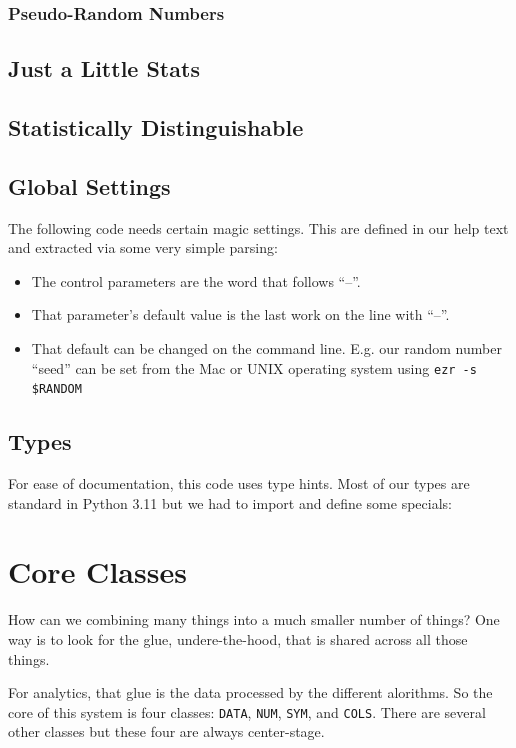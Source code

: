 \documentclass[landscape,	DIV=calc,%
							paper=letter,%
							fontsize=10pt,%
							twocolumn]{scrartcl}	 					%
\newcommand{\VERSION}{3.11}
\begin{document}
\subsubsection{Pseudo-Random Numbers}

\subsection{Just a Little Stats}
\subsection{Statistically Distinguishable}
\subsection{Global Settings}
The following code needs certain magic settings. This are defined in our help text and extracted
via some very simple parsing:
\begin{itemize}
    \item The control parameters are the word that follows ``--''.
    \item That parameter's default value is the last work on the line with ``--''.
    \item That default can be changed on the command line. E.g. our
        random number ``seed'' can be set from the Mac or UNIX operating system  
        using  \verb+ezr -s $RANDOM+
\end{itemize}
\subsection{Types}
For ease of documentation, this code uses type hints.  Most of our types are standard in Python {\VERSION}
but we had to import and define some specials:



\section{Core Classes}
How can we  combining many things into a much smaller number of things? One way is to look for
the glue, undere-the-hood, that is shared across all those things.

For analytics, that glue is the data processed by the different alorithms. So the core
of this system is 
four classes: 
\verb+DATA+, 
\verb+NUM+, 
\verb+SYM+, 
and \verb+COLS+. There are several other classes but these four are always center-stage.
\end{document}
